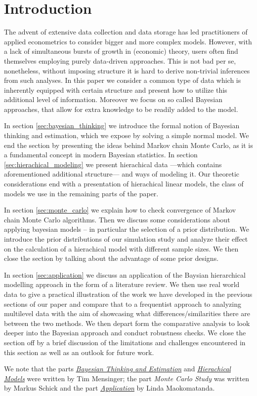 \section{Introduction}

The advent of extensive data collection and data storage has led practitioners of applied econometrics to consider bigger and more complex models.
However, with a lack of simultaneous bursts of growth in (economic) theory, users often find themselves employing purely data-driven approaches.
This is not bad per se, nonetheless, without imposing structure it is hard to derive non-trivial inferences from such analyses.
In this paper we consider a common type of data which is inherently equipped with certain structure and present how to utilize this additional level of information.
Moreover we focus on so called Bayesian approaches, that allow for extra knowledge to be readily added to the model.

In section \ref{sec:bayesian_thinking} we introduce the formal notion of Bayesian thinking and estimation, which we expose by solving a simple normal model.
We end the section by presenting the ideas behind Markov chain Monte Carlo, as it is a fundamental concept in modern Bayesian statistics. In section \ref{sec:hierachical_modeling} we present hierachical data ---which contains aforementioned additional structure--- and ways of modeling it.
Our theoretic considerations end with a presentation of hierachical linear models, the class of models we use in the remaining parts of the paper.

In section \ref{sec:monte_carlo} we explain how to check convergence of Markov chain Monte Carlo algorithms. 
Then we discuss some considerations about applying bayesian models -- in particular the selection of a prior distribution. 
We introduce the prior distributions of our simulation study and analyze their effect on the calculation of a hierachical model with different sample sizes. 
We then close the section by talking about the advantage of some prior designs. 


In section \ref{sec:application} we discuss an application of the Baysian hierarchical modelling approach in the form of a literature review. We then use real world data to give a practical illustration of the work we have developed in the previous sections of our paper and compare that to a frequentist approach to analyzing multilevel data with the aim of showcasing what differences/similarities there are between the two methods. We then depart form the comparative analysis to look deeper into the Bayesian approach and conduct robustness checks. We close the section off by a brief discussion of the limitations and challenges encountered in this section as well as an outlook for future work.

We note that the parts \hyperref[sec:bayesian_thinking]{\emph{Bayesian Thinking and Estimation}} and \hyperref[sec:hierachical_modeling]{\emph{Hierachical Models}} were written by Tim Mensinger; the part \emph{Monte Carlo Study} was written by Markus Schick and the part \hyperref[sec:application]{\emph{Application}} by Linda Maokomatanda.
